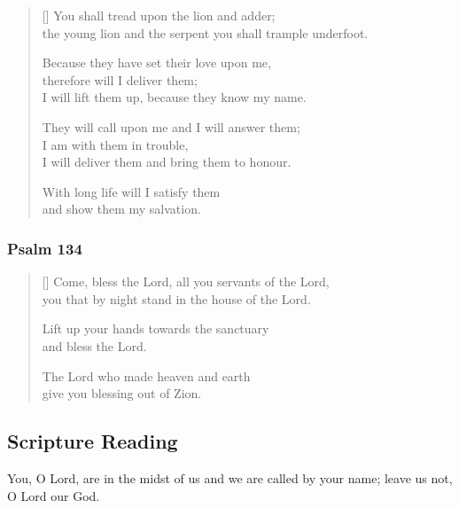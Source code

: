 \documentclass[12pt]{extreport}
\begin{document}
\begin{verse}[\versewidth]
		You shall tread upon the lion and adder; \Pause\\
		the young lion and the serpent you shall trample underfoot.

		Because they have set their love upon me,\\
		\vin therefore will I deliver them; \Pause\\
		I will lift them up, because they know my name.

		They will call upon me and I will answer them; \Pause\\
		I am with them in trouble,\\
		\vin I will deliver them and bring them to honour.

		With long life will I satisfy them \Pause\\
		and show them my salvation.
	\end{verse}

	\subsubsection*{Psalm 134}

	\begin{verse}[\versewidth]
		Come, bless the Lord, all you servants of the Lord, \Pause\\
		you that by night stand in the house of the Lord.

		Lift up your hands towards the sanctuary \Pause\\
		and bless the Lord.

		The Lord who made heaven and earth \Pause\\
		give you blessing out of Zion.
	\end{verse}


	\glorybe

	\subsection*{Scripture Reading}


	\begin{scripture}[Jeremiah 14.9]
		You, O Lord, are in the midst of us and we are called by your name; leave us not, O Lord our God.
	\end{scripture}
\end{document}
